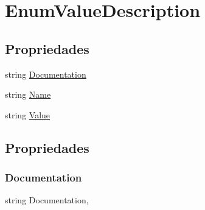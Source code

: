 \hypertarget{classApi3Layers_1_1Areas_1_1HelpPage_1_1ModelDescriptions_1_1EnumValueDescription}{}\section{Enum\+Value\+Description}
\label{classApi3Layers_1_1Areas_1_1HelpPage_1_1ModelDescriptions_1_1EnumValueDescription}
\subsection*{Propriedades}
\begin{DoxyCompactItemize}
\item 
string \hyperlink{classApi3Layers_1_1Areas_1_1HelpPage_1_1ModelDescriptions_1_1EnumValueDescription_a239e2715951fcab2d9b263ef6acfa899}{Documentation}
\item 
string \hyperlink{classApi3Layers_1_1Areas_1_1HelpPage_1_1ModelDescriptions_1_1EnumValueDescription_a7ee9065718e6628dc7791b756fa6c0f9}{Name}
\item 
string \hyperlink{classApi3Layers_1_1Areas_1_1HelpPage_1_1ModelDescriptions_1_1EnumValueDescription_af7b88db799d8f791f785e437bc6099d2}{Value}
\end{DoxyCompactItemize}


\subsection{Propriedades}
\mbox{\label{classApi3Layers_1_1Areas_1_1HelpPage_1_1ModelDescriptions_1_1EnumValueDescription_a239e2715951fcab2d9b263ef6acfa899}} 
\subsubsection{\texorpdfstring{Documentation}{Documentation}}
{\footnotesize\ttfamily string Documentation\hspace{0.3cm}{\ttfamily [get]}, {\ttfamily [set]}}

